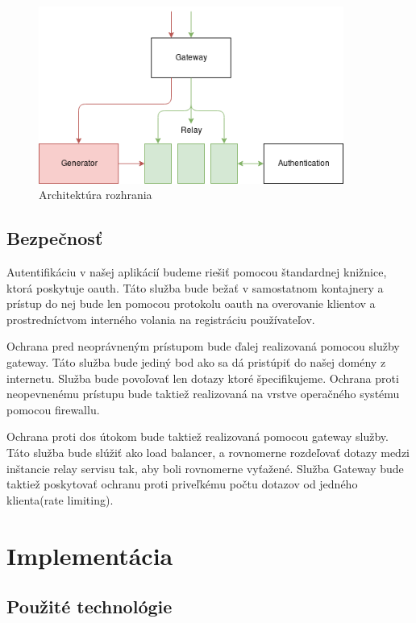 \begin{figure}[!htbp] 
	\centering 
	\includegraphics[width=10cm]{img/architecture.png} 
	\caption{Architektúra rozhrania} 
	\label{architecture} 
\end{figure}  

\subsection{Bezpečnosť} 

Autentifikáciu v našej aplikácií budeme riešiť pomocou štandardnej knižnice, ktorá poskytuje \acrshort{oauth}. Táto služba bude bežať v samostatnom kontajnery a prístup do nej bude len pomocou protokolu \acrshort{oauth} na overovanie klientov a prostredníctvom interného volania na registráciu používateľov. 

Ochrana pred neoprávneným prístupom bude ďalej realizovaná pomocou služby gateway. Táto služba bude jediný bod ako sa dá pristúpiť do našej domény z internetu. Služba bude povoľovať len dotazy ktoré špecifikujeme. Ochrana proti neopevnenému prístupu bude taktiež realizovaná na vrstve operačného systému pomocou firewallu. 

Ochrana proti \acrshort{dos} útokom bude taktiež realizovaná pomocou gateway služby. Táto služba bude slúžiť ako load balancer, a rovnomerne rozdeľovať dotazy medzi inštancie relay servisu tak, aby boli rovnomerne vyťažené. Služba Gateway bude taktiež poskytovať ochranu proti priveľkému počtu dotazov od jedného klienta(rate limiting). 

\section{Implementácia}  

\subsection{Použité technológie}  

